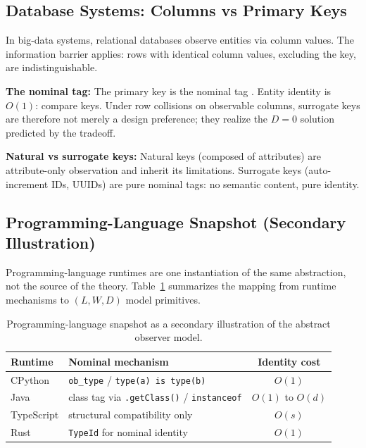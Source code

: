 \subsection{Database Systems: Columns vs Primary Keys}

In big-data systems, relational databases observe entities via column values. The information barrier applies: rows with identical column values, excluding the key, are indistinguishable.

\textbf{The nominal tag:} The primary key is the nominal tag \cite{Codd1990}. Entity identity is $O(1)$: compare keys. Under row collisions on observable columns, surrogate keys are therefore not merely a design preference; they realize the $D=0$ solution predicted by the tradeoff.

\textbf{Natural vs surrogate keys:} Natural keys (composed of attributes) are attribute-only observation and inherit its limitations. Surrogate keys (auto-increment IDs, UUIDs) are pure nominal tags: no semantic content, pure identity.

\subsection{Programming-Language Snapshot (Secondary Illustration)}

Programming-language runtimes are one instantiation of the same abstraction, not the source of the theory. Table~\ref{tab:pl-snapshot} summarizes the mapping from runtime mechanisms to $(L,W,D)$ model primitives.

\begin{table}[ht]
\centering
\begin{tabular}{|l|l|c|}
\hline
\textbf{Runtime} & \textbf{Nominal mechanism} & \textbf{Identity cost} \\
\hline
CPython & \texttt{ob\_type} / \texttt{type(a) is type(b)} \cite{CPythonDocs} & $O(1)$ \\
Java & class tag via \texttt{.getClass()} / \texttt{instanceof} \cite{JVMSpec,JavaDocs} & $O(1)$ to $O(d)$ \\
TypeScript & structural compatibility only \cite{TypeScriptDocs} & $O(s)$ \\
Rust & \texttt{TypeId} for nominal identity \cite{RustDocs} & $O(1)$ \\
\hline
\end{tabular}
\caption{Programming-language snapshot as a secondary illustration of the abstract observer model.}
\label{tab:pl-snapshot}
\end{table}

